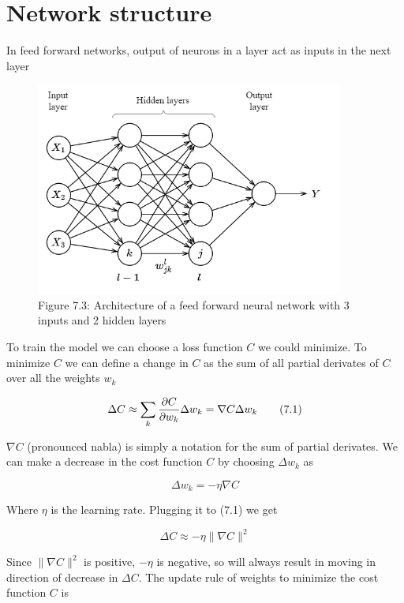 \section{Network structure}

In feed forward networks, output of neurons in a layer act as inputs in the next layer


\begin{figure}[htbp]
    \begin{center}
        \includegraphics[width=287pt]{../img/07-feedforward-network.png}
        \caption{Figure 7.3: Architecture of a feed forward neural network with 3 inputs and 2 hidden layers}
    \end{center}
\end{figure}


To train the model we can choose a loss function \(C\) we could minimize. To minimize \(C\) we can define a change in \(C\) as the sum of all partial derivates of \(C\) over all the weights \(w_k\)

\begin{equation}\Delta C \approx \sum_k { \partial C \over \partial w_k} \Delta w_k = \nabla C \Delta w_k \tag{7.1}\end{equation}

\(\nabla C\) (pronounced nabla) is simply a notation for the sum of partial derivates. We can make a decrease in the cost function \(C\) by choosing \(\Delta w_k\) as

\[\Delta w_k = -\eta \nabla C\]

Where \(\eta\) is the learning rate. Plugging it to (7.1) we get

\[\Delta C \approx - \eta \| \nabla C \| ^ 2\]

Since \(\| \nabla C \| ^ 2\) is positive, \(- \eta\) is negative, so will always result in moving in direction of decrease in \(\Delta C\). The update rule of weights to minimize the cost function \(C\) is

